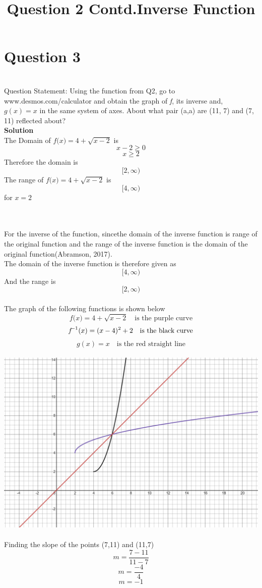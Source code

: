 \documentclass{article}
\begin{document}
\section*{Question 3}
\title{Question 2 Contd.}
\\Question Statement: Using the function from Q2, go to www.desmos.com/calculator and obtain the graph of \textit{f}, its inverse and, ${g(x) = x}$ in the same system of axes. About what pair (a,a) are (11, 7) and (7, 11) reflected about?
\\\textbf{Solution}\\
The Domain of ${\textit{f(x)}=4+\sqrt{x-2}}$ is 
$${x - 2 \geq 0}$$
$${x \geq 2}$$
Therefore the domain is $${[2, \infty)}$$
The range of ${\textit{f(x)}=4+\sqrt{x-2}}$ is $${[4,\infty)}$$ for ${x=2}$\\
\\\title{Inverse Function}\\
For the inverse of the function, sincethe domain of the inverse function is range of the original function and the range of the inverse function is the domain of the original function(Abramson, 2017).
\\The domain of the inverse function is therefore given as $${[4,\infty)}$$
And the range is $${[2,\infty)}$$
\\The graph of the following functions is shown below\\
$${\textit{f(x)} = 4+\sqrt{x-2}\quad \text{is the purple curve}}$$ 
$${\textit f^{-1}(x) = (x - 4)^2 + 2 \quad \text{is the black curve}}$$
$${g(x)=x\quad \text{is the red straight line}}$$
\\\includegraphics[scale = 0.15]{waQ3}\\
\\Finding the slope of the points (7,11) and (11,7)
$${m=\frac{7-11}{11-7}}$$
$${m=\frac{-4}{4}}$$
$${m=-1}$$
\end{document}
